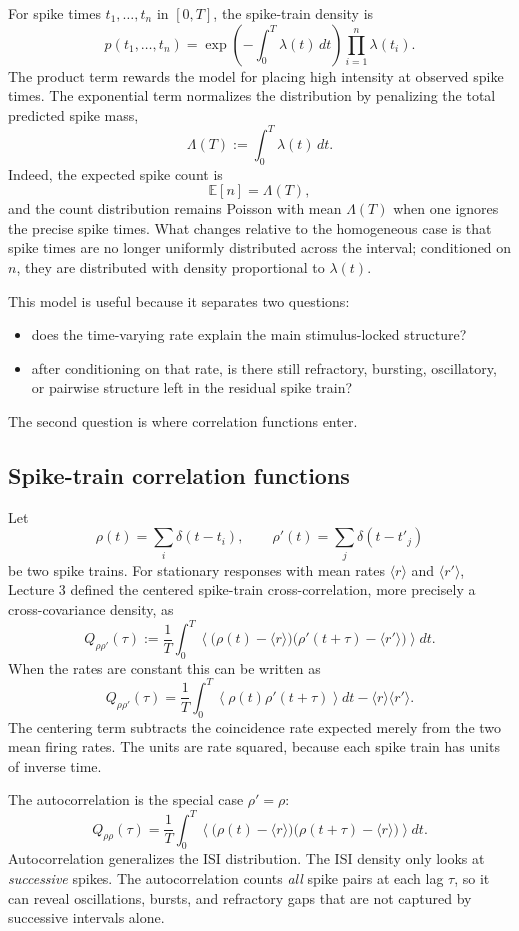 \documentclass[11pt]{article}
\begin{document}
For spike times $t_1,\dots,t_n$ in $[0,T]$, the spike-train density is
\[
p(t_1,\dots,t_n)
=
\exp\!\left(-\int_0^T \lambda(t)\,dt\right)
\prod_{i=1}^{n}\lambda(t_i).
\]
The product term rewards the model for placing high intensity at observed spike times. The exponential term normalizes the distribution by penalizing the total predicted spike mass,
\[
\Lambda(T):=\int_0^T \lambda(t)\,dt.
\]
Indeed, the expected spike count is
\[
\mathbb{E}[n]=\Lambda(T),
\]
and the count distribution remains Poisson with mean $\Lambda(T)$ when one ignores the precise spike times. What changes relative to the homogeneous case is that spike times are no longer uniformly distributed across the interval; conditioned on $n$, they are distributed with density proportional to $\lambda(t)$.

This model is useful because it separates two questions:
\begin{itemize}
    \item does the time-varying rate explain the main stimulus-locked structure?
    \item after conditioning on that rate, is there still refractory, bursting, oscillatory, or pairwise structure left in the residual spike train?
\end{itemize}
The second question is where correlation functions enter.

\subsection{Spike-train correlation functions}

Let
\[
\rho(t)=\sum_i \delta(t-t_i),
\qquad
\rho'(t)=\sum_j \delta(t-t'_j)
\]
be two spike trains. For stationary responses with mean rates $\langle r\rangle$ and $\langle r'\rangle$, Lecture 3 defined the centered spike-train cross-correlation, more precisely a cross-covariance density, as
\[
Q_{\rho\rho'}(\tau)
:=
\frac{1}{T}\int_0^T
\left\langle
\bigl(\rho(t)-\langle r\rangle\bigr)
\bigl(\rho'(t+\tau)-\langle r'\rangle\bigr)
\right\rangle dt.
\]
When the rates are constant this can be written as
\[
Q_{\rho\rho'}(\tau)
=
\frac{1}{T}\int_0^T
\left\langle
\rho(t)\rho'(t+\tau)
\right\rangle dt
-\langle r\rangle\langle r'\rangle.
\]
The centering term subtracts the coincidence rate expected merely from the two mean firing rates. The units are rate squared, because each spike train has units of inverse time.

The autocorrelation is the special case $\rho'=\rho$:
\[
Q_{\rho\rho}(\tau)
=
\frac{1}{T}\int_0^T
\left\langle
\bigl(\rho(t)-\langle r\rangle\bigr)
\bigl(\rho(t+\tau)-\langle r\rangle\bigr)
\right\rangle dt.
\]
Autocorrelation generalizes the ISI distribution. The ISI density only looks at \emph{successive} spikes. The autocorrelation counts \emph{all} spike pairs at each lag $\tau$, so it can reveal oscillations, bursts, and refractory gaps that are not captured by successive intervals alone.
\end{document}
